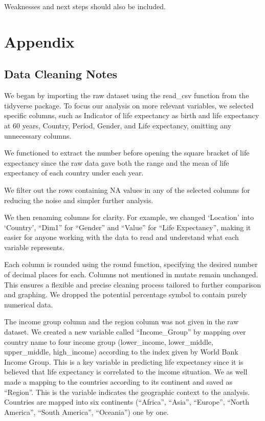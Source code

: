 \documentclass[
  letterpaper,
  DIV=11,
  numbers=noendperiod]{scrartcl}
\begin{document}
Weaknesses and next steps should also be included.

\newpage

\appendix

\section{Appendix}\label{sec-appendix}

\subsection{Data Cleaning Notes}\label{data-cleaning-notes}

We began by importing the raw dataset using the read\_csv function from
the tidyverse package. To focus our analysis on more relevant variables,
we selected specific columns, such as Indicator of life expectancy as
birth and life expectancy at 60 years, Country, Period, Gender, and Life
expectancy, omitting any unnecessary columns.

We functioned to extract the number before opening the square bracket of
life expectancy since the raw data gave both the range and the mean of
life expectancy of each country under each year.

We filter out the rows containing NA values in any of the selected
columns for reducing the noise and simpler further analysis.

We then renaming columns for clarity. For example, we changed `Location'
into `Country', ``Dim1'' for ``Gender'' and ``Value'' for ``Life
Expectancy'', making it easier for anyone working with the data to read
and understand what each variable represents.

Each column is rounded using the round function, specifying the desired
number of decimal places for each. Columns not mentioned in mutate
remain unchanged. This ensures a flexible and precise cleaning process
tailored to further comparison and graphing. We dropped the potential
percentage symbol to contain purely numerical data.

The income group column and the region column was not given in the raw
dataset. We created a new variable called ``Income\_Group'' by mapping
over country name to four income group (lower\_income, lower\_middle,
upper\_middle, high\_income) according to the index given by World Bank
Income Group. This is a key variable in predicting life expectancy since
it is believed that life expectancy is correlated to the income
situation. We as well made a mapping to the countries according to its
continent and saved as ``Region''. This is the variable indicates the
geographic context to the analysis. Countries are mapped into six
continents (``Africa'', ``Asia'', ``Europe'', ``North America'', ``South
America'', ``Oceania'') one by one.
\end{document}
